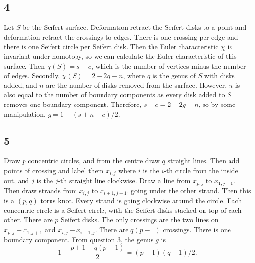 \documentclass{article}
\theoremstyle{definition}
\numberwithin{theorem}{section}
\numberwithin{equation}{section}
\begin{document}
\subsection{4}
Let $S$ be the Seifert surface. 
Deformation retract the Seifert disks to a point and deformation retract the crossings to edges. There is one crossing per edge and there is one Seifert circle per Seifert disk. Then the Euler characteristic $\chi$ is invariant under homotopy, so we can calculate the Euler characteristic of this surface. Then $\chi(S) = s - c$, which is the number of vertices minus the number of edges. Secondly, $\chi(S) = 2 - 2g - n$, where $g$ is the genus of $S$ with disks added, and $n$ are the number of disks removed from the surface. However, $n$ is also equal to the number of boundary components as every disk added to $S$ removes one boundary component. Therefore, $s - c = 2 - 2g - n$, so by some manipulation, $g = 1 - (s + n - c)/2$. 

\subsection{5}
Draw $p$ concentric circles, and from the centre draw $q$ straight lines. Then add points of crossing and label them $x_{i,j}$ where $i$ is the $i$-th circle from the inside out, and $j$ is the $j$-th straight line clockwise. Draw a line from $x_{p, j}$ to $x_{1, j+1}$. Then draw strands from $x_{i, j}$ to $x_{i + 1, j + 1}$, going under the other strand. Then this is a $(p, q)$ torus knot. Every strand is going clockwise around the circle. Each concentric circle is a Seifert circle, with the Seifert disks stacked on top of each other. There are $p$ Seifert disks. The only crossings are the two lines on $x_{p, j} - x_{1, j+1}$ and $x_{i, j} - x_{i + 1, j}$. There are $q(p-1)$ crossings. There is one boundary component. From question 3, the genus $g$ is
\[1 - \frac{p + 1 - q(p-1)}{2} = (p-1)(q-1)/2.\]
\end{document}
